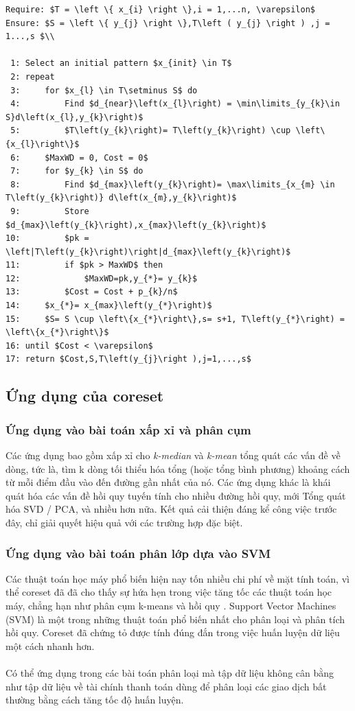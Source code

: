 \documentclass[a4paper, 12pt, oneside]{report}
\begin{document}
\begin{lstlisting}[mathescape,caption={Algorithm ProTraS}]
Require: $T = \left \{ x_{i} \right \},i = 1,...n, \varepsilon$
Ensure: $S = \left \{ y_{j} \right \},T\left ( y_{j} \right ) ,j = 1...,s $\\

 1: Select an initial pattern $x_{init} \in T$
 2: repeat
 3:     for $x_{l} \in T\setminus S$ do
 4:         Find $d_{near}\left(x_{l}\right) = \min\limits_{y_{k}\in S}d\left(x_{l},y_{k}\right)$
 5:         $T\left(y_{k}\right)= T\left(y_{k}\right) \cup \left\{x_{l}\right\}$
 6:     $MaxWD = 0, Cost = 0$
 7:     for $y_{k} \in S$ do
 8:         Find $d_{max}\left(y_{k}\right)= \max\limits_{x_{m} \in T\left(y_{k}\right)} d\left(x_{m},y_{k}\right)$
 9:         Store $d_{max}\left(y_{k}\right),x_{max}\left(y_{k}\right)$
10:         $pk = \left|T\left(y_{k}\right)\right|d_{max}\left(y_{k}\right)$
11:         if $pk > MaxWD$ then
12:             $MaxWD=pk,y_{*}= y_{k}$
13:         $Cost = Cost + p_{k}/n$
14:     $x_{*}= x_{max}\left(y_{*}\right)$
15:     $S= S \cup \left\{x_{*}\right\},s= s+1, T\left(y_{*}\right) = \left\{x_{*}\right\}$
16: until $Cost < \varepsilon$
17: return $Cost,S,T\left(y_{j}\right ),j=1,...,s$
\end{lstlisting}
\subsection{Ứng dụng của coreset}
\subsubsection{Ứng dụng vào bài toán xấp xỉ và phân cụm}
Các ứng dụng bao gồm xấp xỉ cho \textit{k-median} và \textit{k-mean} tổng quát các vấn đề về dòng, tức là, tìm k dòng tối thiểu hóa tổng (hoặc tổng bình phương) khoảng cách từ mỗi điểm đầu vào đến đường gần nhất của nó. Các ứng dụng khác là khái quát hóa các vấn đề hồi quy tuyến tính cho nhiều đường hồi quy, mới Tổng quát hóa SVD / PCA, và nhiều hơn nữa. Kết quả cải thiện đáng kể công việc trước đây, chỉ giải quyết hiệu quả với các trường hợp đặc biệt.\\
\subsubsection{Ứng dụng vào bài toán phân lớp dựa vào SVM}
Các thuật toán học máy phổ biến hiện nay tốn nhiều chi phí về mặt tính toán,  vì thể coreset đã đã cho thấy sự hứa hẹn trong việc tăng tốc các thuật toán học máy, chẳng hạn như phân cụm k-means và hồi quy . Support Vector Machines (SVM) là một trong những thuật toán phổ biến nhất cho phân loại và phân tích hồi quy. Coreset đã chứng tỏ được tính đúng đắn trong việc huấn luyện dữ liệu một cách nhanh hơn.\\ \\
Có thể ứng dụng trong các bài toán phân loại mà tập dữ liệu không cân bằng như tập dữ liệu về tài chính thanh toán dùng để phân loại các giao dịch bất thường bằng cách tăng tốc độ huấn luyện.
\end{document}
